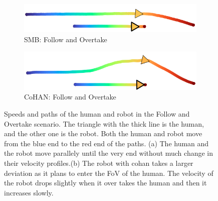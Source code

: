 \begin{figure}[h!]
\begin{subfigure}{.5\columnwidth}
\end{subfigure}
\vspace{0.15cm}
\begin{subfigure}{.45\columnwidth}
  \includegraphics[width=\textwidth]{images/chapter6/smb/follow.png}
  \caption{SMB: Follow and Overtake}
\end{subfigure}
\hspace{0.15cm}
\begin{subfigure}{.45\columnwidth}
  \includegraphics[width=\textwidth]{images/chapter6/cohan/follow.png}
  \caption{CoHAN: Follow and Overtake}
\end{subfigure}
\caption{Speeds and paths of the human and robot in the Follow and Overtake scenario. The triangle with the thick line is the human, and the other one is the robot. Both the human and robot move from the blue end to the red end of the paths. (a) The human and the robot move parallely until the very end without much change in their velocity profiles.(b) The robot with \acrshort{cohan} takes a larger deviation as it plans to enter the FoV of the human. The velocity of the robot drops slightly when it over takes the human and then it increases slowly.}
\label{fig:paths_follow}
\end{figure}

